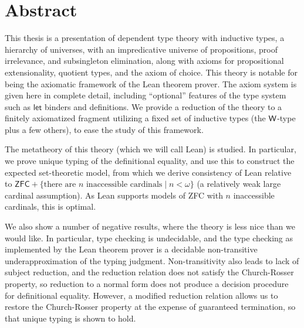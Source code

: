 \section*{Abstract}

This thesis is a presentation of dependent type theory with inductive types, a hierarchy of universes, with an impredicative universe of propositions, proof irrelevance, and subsingleton elimination, along with axioms for propositional extensionality, quotient types, and the axiom of choice. This theory is notable for being the axiomatic framework of the Lean theorem prover. The axiom system is given here in complete detail, including ``optional'' features of the type system such as $\mathsf{let}$ binders and definitions. We provide a reduction of the theory to a finitely axiomatized fragment utilizing a fixed set of inductive types (the $\mathsf{W}$-type plus a few others), to ease the study of this framework.

The metatheory of this theory (which we will call Lean) is studied. In particular, we prove unique typing of the definitional equality, and use this to construct the expected set-theoretic model, from which we derive consistency of Lean relative to $\mathsf{ZFC}+\{\mbox{there are }n\mbox{ inaccessible cardinals}\mid n<\omega\}$ (a relatively weak large cardinal assumption). As Lean supports models of ZFC with $n$ inaccessible cardinals, this is optimal.

We also show a number of negative results, where the theory is less nice than we would like. In particular, type checking is undecidable, and the type checking as implemented by the Lean theorem prover is a decidable non-transitive underapproximation of the typing judgment. Non-transitivity also leads to lack of subject reduction, and the reduction relation does not satisfy the Church-Rosser property, so reduction to a normal form does not produce a decision procedure for definitional equality. However, a modified reduction relation allows us to restore the Church-Rosser property at the expense of guaranteed termination, so that unique typing is shown to hold.
